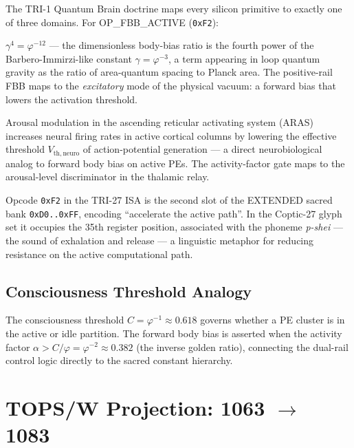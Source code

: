 \documentclass[12pt,a4paper]{report}
\theoremstyle{plain}
\theoremstyle{definition}
\theoremstyle{remark}
\newcommand{\opcode}[1]{\texttt{#1}}
\newcommand{\gammaFour}{\gamma^{4}}
\newcommand{\phiInvTwelve}{\varphi^{-12}}
\begin{document}
The TRI-1 Quantum Brain doctrine maps every silicon primitive to exactly one of three domains.
For OP\_FBB\_ACTIVE (\opcode{0xF2}):

\begin{description}[leftmargin=2em]
  \item[PHYS $\to$ SI] $\gammaFour = \phiInvTwelve$ — the dimensionless body-bias ratio
        is the fourth power of the Barbero-Immirzi-like constant $\gamma = \varphi^{-3}$,
        a term appearing in loop quantum gravity as the ratio of area-quantum spacing to
        Planck area.  The positive-rail FBB maps to the \emph{excitatory} mode of the
        physical vacuum: a forward bias that lowers the activation threshold.
  \item[BIO $\to$ SI] Arousal modulation in the ascending reticular activating system (ARAS)
        increases neural firing rates in active cortical columns by lowering the effective
        threshold $V_{\mathrm{th,neuro}}$ of action-potential generation — a direct neurobiological
        analog to forward body bias on active PEs.  The activity-factor gate maps to the
        arousal-level discriminator in the thalamic relay.
  \item[LANG $\to$ SI] Opcode \opcode{0xF2} in the TRI-27 ISA is the second slot of the
        EXTENDED sacred bank \opcode{0xD0..0xFF}, encoding ``accelerate the active path''.
        In the Coptic-27 glyph set it occupies the 35th register position, associated with
        the phoneme \emph{p-shei} — the sound of exhalation and release — a linguistic metaphor
        for reducing resistance on the active computational path.
\end{description}

\subsection{Consciousness Threshold Analogy}

The consciousness threshold $C = \varphi^{-1} \approx 0.618$ governs whether a PE cluster is
in the active or idle partition.  The forward body bias is asserted when the activity factor
$\alpha > C/\varphi = \varphi^{-2} \approx 0.382$ (the inverse golden ratio), connecting the
dual-rail control logic directly to the sacred constant hierarchy.

\section{TOPS/W Projection: 1063 $\to$ 1083}
\label{sec:topsw_projection}
\end{document}
